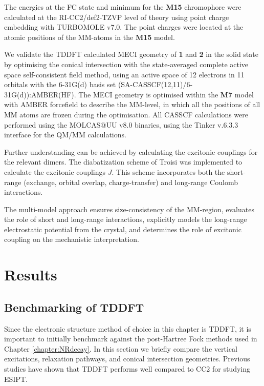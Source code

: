 The energies at the FC state and \Kstar{} minimum for the \textbf{M15} chromophore were calculated at the RI-CC2/def2-TZVP level of theory using point charge embedding with TURBOMOLE v7.0.\cite{Hattig2002,Turbomole} The point charges were located at the atomic positions of the MM-atoms in the \textbf{M15} model.

We validate the TDDFT calculated MECI geometry of \textbf{1} and \textbf{2} in the solid state by optimising the conical intersection with the state-averaged complete active space self-consistent field  method, using an active space of 12 electrons in 11 orbitals with the 6-31G(d) basis set (SA-CASSCF(12,11)/6-31G(d)):AMBER(HF). The MECI geometry is optimised within the \textbf{M7} model with AMBER forcefield to describe the MM-level, in which all the positions of all MM atoms are frozen during the optimisation. All CASSCF calculations were performed using the MOLCAS@UU v8.0 binaries, using  the Tinker v.6.3.3 interface for the QM/MM calculations. 

Further understanding can be achieved by calculating the excitonic couplings for the relevant dimers. The diabatization scheme of Troisi was implemented to calculate the excitonic couplings $J$.\cite{Arago2015} This scheme incorporates both the short-range (exchange, orbital overlap, charge-transfer) and long-range Coulomb interactions. 

The multi-model approach ensures size-consistency of the MM-region, evaluates the role of short and long-range interactions, explicitly models the long-range electrostatic potential from the crystal, and determines the role of excitonic coupling on the mechanistic interpretation.
\section{Results}\label{section: Inter_Results}
\subsection{Benchmarking of TDDFT}\label{section: Inter_benchmark}
Since the electronic structure method of choice in this chapter is \ac{TDDFT}, it is important to initially benchmark against the post-Hartree Fock methods used in Chapter \ref{chapter:NRdecay}. In this section we briefly compare the vertical excitations, relaxation pathways, and conical intersection geometries. Previous studies have shown that TDDFT performs well compared to CC2 for studying ESIPT.\cite{Aquino2005}

